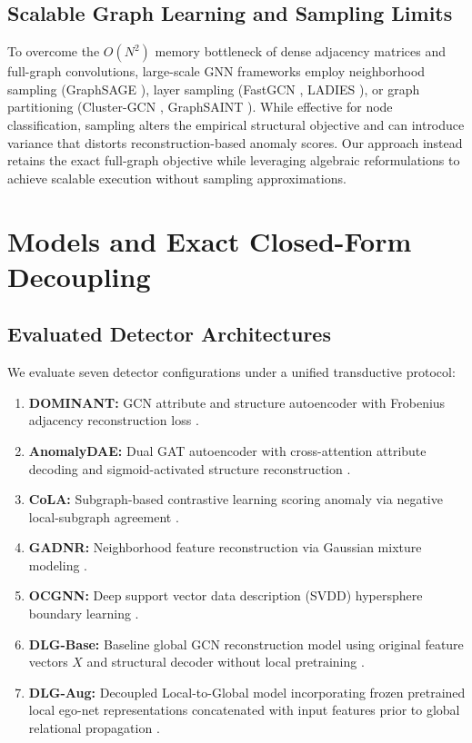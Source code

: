 \documentclass[11pt,a4paper]{article}
\begin{document}
\subsection{Scalable Graph Learning and Sampling Limits}
To overcome the $O(N^2)$ memory bottleneck of dense adjacency matrices and full-graph convolutions, large-scale GNN frameworks employ neighborhood sampling (GraphSAGE \cite{hamilton2017graphsage}), layer sampling (FastGCN \cite{chen2018fastgcn}, LADIES \cite{zou2019ladies}), or graph partitioning (Cluster-GCN \cite{chiang2019clustergcn}, GraphSAINT \cite{zeng2020graphsaint}). While effective for node classification, sampling alters the empirical structural objective and can introduce variance that distorts reconstruction-based anomaly scores. Our approach instead retains the exact full-graph objective while leveraging algebraic reformulations to achieve scalable execution without sampling approximations.

\section{Models and Exact Closed-Form Decoupling}
\label{sec:models}

\subsection{Evaluated Detector Architectures}
We evaluate seven detector configurations under a unified transductive protocol:
\begin{enumerate}
    \item \textbf{DOMINANT:} GCN attribute and structure autoencoder with Frobenius adjacency reconstruction loss \cite{ding2019deep}.
    \item \textbf{AnomalyDAE:} Dual GAT autoencoder with cross-attention attribute decoding and sigmoid-activated structure reconstruction \cite{fan2020anomalydae}.
    \item \textbf{CoLA:} Subgraph-based contrastive learning scoring anomaly via negative local-subgraph agreement \cite{liu2022cola}.
    \item \textbf{GADNR:} Neighborhood feature reconstruction via Gaussian mixture modeling \cite{roy2024gadnr}.
    \item \textbf{OCGNN:} Deep support vector data description (SVDD) hypersphere boundary learning \cite{wang2021ocgnn}.
    \item \textbf{DLG-Base:} Baseline global GCN reconstruction model using original feature vectors $X$ and structural decoder without local pretraining \cite{park2026dlg}.
    \item \textbf{DLG-Aug:} Decoupled Local-to-Global model incorporating frozen pretrained local ego-net representations concatenated with input features prior to global relational propagation \cite{park2026dlg}.
\end{enumerate}
\end{document}
